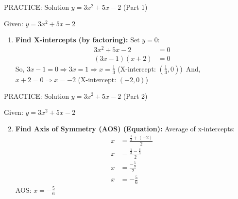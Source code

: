 \documentclass[aspectratio=169]{beamer}
\begin{document}
\begin{frame}{PRACTICE: Solution $y = 3x^2 + 5x - 2$ (Part 1)}
    \begin{tcolorbox}[colback=lightgray,colframe=accent,title=Detailed Solution]
        \footnotesize
        Given: $y = 3x^2 + 5x - 2$
        
        \begin{enumerate}
            \item \textbf{Find X-intercepts (by factoring):}
            Set $y=0$:
            \begin{align*}
                3x^2 + 5x - 2 &= 0 \\
                (3x - 1)(x + 2) &= 0
            \end{align*}
            So, $3x - 1 = 0 \Rightarrow 3x = 1 \Rightarrow x = \frac{1}{3}$ (X-intercept: $(\frac{1}{3},0)$)\
            And, $x + 2 = 0 \Rightarrow x = -2$ (X-intercept: $(-2,0)$)
        \end{enumerate}
    \end{tcolorbox}
\end{frame}

\begin{frame}{PRACTICE: Solution $y = 3x^2 + 5x - 2$ (Part 2)}
    \begin{tcolorbox}[colback=lightgray,colframe=accent,title=Detailed Solution (Part 2)]
        \footnotesize
        Given: $y = 3x^2 + 5x - 2$
        
        \begin{enumerate}
            \setcounter{enumi}{1}
            \item \textbf{Find Axis of Symmetry (AOS) (Equation):}
            Average of x-intercepts:
            \begin{align*}
                x &= \frac{\frac{1}{3} + (-2)}{2} \\
                x &= \frac{\frac{1}{3} - \frac{6}{3}}{2} \\
                x &= \frac{-\frac{5}{3}}{2} \\
                x &= -\frac{5}{6}
            \end{align*}
            AOS: $x = -\frac{5}{6}$
        \end{enumerate}
    \end{tcolorbox}
\end{frame}
\end{document}
